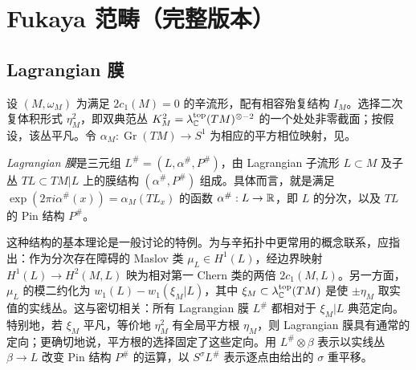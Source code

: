 \section{Fukaya 范畴（完整版本）}\label{sec:12}\label{section:12}
\subsection{Lagrangian 膜}\label{sec:12a}
设 $(M,\allowbreak \omega_M)$ 为满足 $2c_1(M)=0$ 的辛流形，配有相容殆复结构 $I_M$。选择二次复体积形式 $\eta_M^2$，即双典范丛 $K_M^2=\lambda_{\mathbb C}^{\mathrm{top}}(TM)^{\otimes-2}$ 的一个处处非零截面；按假设，该丛平凡。令 $\alpha_M:\operatorname{Gr}(TM)\to S^1$ 为相应的平方相位映射，见。
\begin{definition*}
\emph{Lagrangian 膜}是三元组 $L^\#=(L,\allowbreak \alpha^\#,\allowbreak P^\#)$，由 Lagrangian 子流形 $L\subset M$ 及子丛 $TL\subset TM|L$ 上的膜结构 $(\alpha^\#,\allowbreak P^\#)$ 组成。具体而言，就是满足 $\exp(2\pi i\alpha^\#(x))=\alpha_M(TL_x)$ 的函数 $\alpha^\#:L\to\mathbb R$，即 $L$ 的分次，以及 $TL$ 的 Pin 结构 $P^\#$。
\end{definition*}
这种结构的基本理论是一般讨论的特例。为与辛拓扑中更常用的概念联系，应指出：作为分次存在障碍的 Maslov 类 $\mu_L\in H^1(L)$，经边界映射 $H^1(L)\to H^2(M,\allowbreak L)$ 映为相对第一 Chern 类的两倍 $2c_1(M,\allowbreak L)$。另一方面，$\mu_L$ 的模二约化为 $w_1(L)-w_1(\xi_M|L)$，其中 $\xi_M\subset\lambda_{\mathbb C}^{\mathrm{top}}(TM)$ 是使 $\pm\eta_M$ 取实值的实线丛。这与密切相关：所有 Lagrangian 膜 $L^\#$ 都相对于 $\xi_M|L$ 典范定向。特别地，若 $\xi_M$ 平凡，等价地 $\eta_M^2$ 有全局平方根 $\eta_M$，则 Lagrangian 膜具有通常的定向；更确切地说，平方根的选择固定了这些定向。用 $L^\#\otimes\beta$ 表示以实线丛 $\beta\to L$ 改变 Pin 结构 $P^\#$ 的运算，以 $S^\sigma L^\#$ 表示逐点由给出的 $\sigma$ 重平移。
